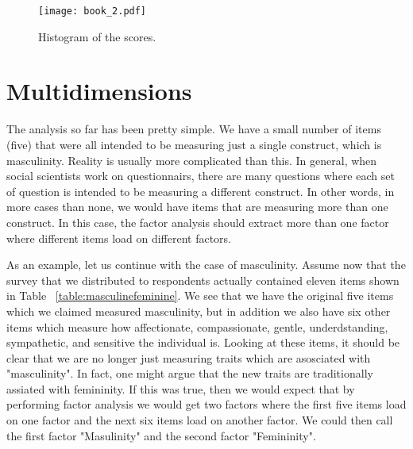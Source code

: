 \documentclass[a4paper,12pt,oneside]{book}
\begin{document}
\begin{stlog}\end{stlog}
\begin{figure}[h]
    \centering
    \texttt{[image: book\_2.pdf]}
    \caption{Histogram of the scores.}
    \label{fig:histgender}
\end{figure}

\section{Multidimensions}
The analysis so far has been pretty simple. We have a small number of items (five) that were all intended to be measuring just a single construct, 
which is masculinity. Reality is usually more complicated than this. In general, when social scientists work on questionnairs, there are many
questions where each set of question is intended to be measuring a different construct. In other words, in more cases than none, we would have 
items that are measuring more than one construct. In this case, the factor analysis should extract more than one factor where different items
load on different factors.

As an example, let us continue with the case of masculinity. Assume now that the survey that we distributed to respondents actually contained
eleven items shown in Table ~\ref{table:masculinefeminine}. We see that we have the original five items which we claimed measured masculinity, but in
addition we also have six other items which measure how affectionate, compassionate, gentle, underdstanding, sympathetic, and sensitive the 
individual is. Looking at these items, it should be clear that we are no longer just measuring traits which are asosciated with "masculinity". In fact,
one might argue that the new traits are traditionally assiated with femininity. If this was true, then we would expect that by performing factor
analysis we would get two factors where the first five items load on one factor and the next six items load on another factor. We could then call
the first factor "Masulinity" and the second factor "Femininity". 
\end{document}

